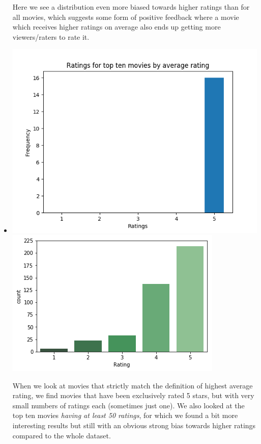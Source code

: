 \begin{itemize}
        Here we see a distribution even more biased towards higher ratings than for all movies, which suggests some form of positive feedback where a movie which receives higher ratings on average also ends up getting more viewers/raters to rate it.

    \item {}

        \includegraphics[scale=.5]{basics_top_ten_rated.png}
        \includegraphics[scale=.5]{basics_top_ten_over50ratings.png}

        When we look at movies that strictly match the definition of highest average rating, we find movies that have been exclusively rated 5 stars, but with very small numbers of ratings each (sometimes just one). We also looked at the top ten movies \textit{having at least 50 ratings}, for which we found a bit more interesting results but still with an obvious strong bias towards higher ratings compared to the whole dataset.


\end{itemize}
